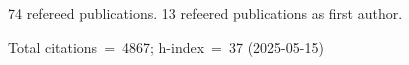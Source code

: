 74 refereed publications. 13 refeered publications as first author.

Total citations~=~4867; h-index~=~37 (2025-05-15)